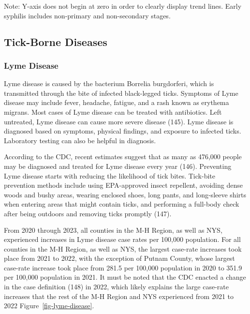 \documentclass[
  english,
  letterpaper,
]{report}
\begin{document}
\begin{tcolorbox}[enhanced jigsaw, breakable, leftrule=.75mm, title=\textcolor{quarto-callout-note-color}{\faInfo}\hspace{0.5em}{Note}, bottomrule=.15mm, opacityback=0, left=2mm, colback=white, bottomtitle=1mm, coltitle=black, colbacktitle=quarto-callout-note-color!10!white, colframe=quarto-callout-note-color-frame, opacitybacktitle=0.6, toptitle=1mm, titlerule=0mm, arc=.35mm, rightrule=.15mm, toprule=.15mm]

Note: Y-axis does not begin at zero in order to clearly display trend
lines. Early syphilis includes non-primary and non-secondary stages.

\end{tcolorbox}

\subsection{Tick-Borne Diseases}\label{tick-borne-diseases}

\subsubsection{Lyme Disease}\label{lyme-disease}

Lyme disease is caused by the bacterium Borrelia burgdorferi, which is
transmitted through the bite of infected black-legged ticks. Symptoms of
Lyme disease may include fever, headache, fatigue, and a rash known as
erythema migrans. Most cases of Lyme disease can be treated with
antibiotics. Left untreated, Lyme disease can cause more severe disease
(145). Lyme disease is diagnosed based on symptoms, physical findings,
and exposure to infected ticks. Laboratory testing can also be helpful
in diagnosis.

According to the CDC, recent estimates suggest that as many as 476,000
people may be diagnosed and treated for Lyme disease every year (146).
Preventing Lyme disease starts with reducing the likelihood of tick
bites. Tick-bite prevention methods include using EPA-approved insect
repellent, avoiding dense woods and bushy areas, wearing enclosed shoes,
long pants, and long-sleeve shirts when entering areas that might
contain ticks, and performing a full-body check after being outdoors and
removing ticks promptly (147).

From 2020 through 2023, all counties in the M-H Region, as well as NYS,
experienced increases in Lyme disease case rates per 100,000 population.
For all counties in the M-H Region, as well as NYS, the largest
case-rate increases took place from 2021 to 2022, with the exception of
Putnam County, whose largest case-rate increase took place from 281.5
per 100,000 population in 2020 to 351.9 per 100,000 population in 2021.
It must be noted that the CDC enacted a change in the case definition
(148) in 2022, which likely explains the large case-rate increases that
the rest of the M-H Region and NYS experienced from 2021 to 2022
Figure~\ref{fig-lyme-disease}.
\end{document}
